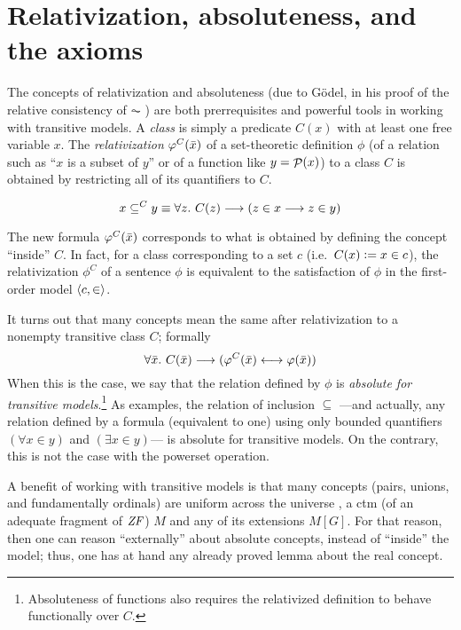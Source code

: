 \section{Relativization,  absoluteness, and the axioms}
\label{sec:relat-absol}

The concepts of relativization and absoluteness (due to Gödel, in his
proof of the relative consistency of $\AC$ \cite{godel-L}) 
are both
prerrequisites and powerful tools in working with transitive
models. A \emph{class} is simply a predicate $C(x)$ with at least one
free variable $x$.
The \emph{relativization} $\phi^C(\bx)$ of a set-theoretic
definition
$\phi$ (of a relation such
as ``$x$ is a subset of $y$'' or of a function like $y=\P(x)$) to
a class $C$ is obtained by restricting all of its quantifiers to $C$.

\[
x \sbq^C y \equiv \forall z.\ C(z) \longrightarrow (z\in x
\longrightarrow z\in y)
\]

The new formula $\phi^C(\bx)$ corresponds to what is obtained by defining
the concept ``inside'' $C$. In fact, for a class corresponding to a
set $c$ (i.e.\ $C(x) \defi x \in c$), the relativization $\phi^C$ of a 
sentence $\phi$ is equivalent to the satisfaction of $\phi$ in the
first-order model $\lb c, \in\rb$.

It turns out that many concepts mean the
same after relativization to a nonempty transitive class $C$; formally
\[
\forall\bx.\ C(\bx) \longrightarrow (\phi^C(\bx) \longleftrightarrow
\phi(\bx))
\]
When this is the case, we say that the relation defined by $\phi$ is
\emph{absolute for transitive models}.\footnote{Absoluteness of
  functions also requires the relativized definition to behave
  functionally over $C$.} As examples, the relation of inclusion
$\subseteq$ ---and actually, any relation defined by a formula
(equivalent to one) using only bounded quantifiers $(\forall x\in y)$
and $(\exists x\in y)$--- is absolute for transitive models. On the
contrary, this is not the case with the powerset operation.

A benefit of working with transitive models
is that many concepts (pairs, unions, and fundamentally ordinals) are
uniform across the universe , a ctm (of an adequate fragment
of $\ZF$) $M$ and any of its extensions $M[G]$.
For that reason, then one can reason
``externally'' about absolute concepts, instead
of ``inside'' the model; thus, one has at hand any already proved
lemma about the real concept.

